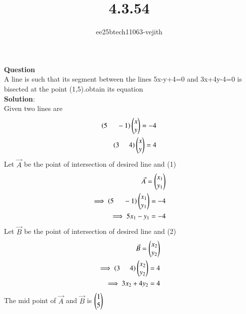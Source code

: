 \documentclass[journal]{IEEEtran}
\begin{document}

\vspace{3cm}

\title{4.3.54}
\author{ee25btech11063-vejith}

\maketitle
{\let\newpage\relax\maketitle}
\renewcommand{\thefigure}{\theenumi}
\renewcommand{\thetable}{\theenumi}
\setlength{\intextsep}{10pt} %
\textbf{Question}\\
A line is such that its segment between the lines 5x-y+4=0 and 3x+4y-4=0 is bisected at the point (1,5).obtain its equation\\
\textbf{Solution}:\\
Given two lines are
\begin{align}
    \left(5\hspace{0.5cm}-1\right)\begin{pmatrix}x\\y\end{pmatrix}=-4\\
    \left(3\hspace{0.5cm}4\right)\begin{pmatrix}x\\y\end{pmatrix}=4
\end{align}
Let $\Vec{A}$ be the point of intersection of desired line and (1)
\begin{align}
    \Vec{A}=\begin{pmatrix}x_1\\y_1\end{pmatrix}\\
    \implies \left(5\hspace{0.5cm}-1\right)\begin{pmatrix}x_1\\y_1\end{pmatrix}=-4\\
    \implies 5x_1-y_1=-4
\end{align}
Let $\Vec{B}$ be the point of intersection of desired line and (2)
\begin{align}
    \Vec{B}=\begin{pmatrix}x_2\\y_2\end{pmatrix}\\
    \implies \left(3\hspace{0.5cm}4\right)\begin{pmatrix}x_2\\y_2\end{pmatrix}=4\\
    \implies 3x_2+4y_2=4
\end{align}
The mid point of $\Vec{A}$ and $\Vec{B}$ is $\begin{pmatrix}1\\5\end{pmatrix}$
\end{document}
